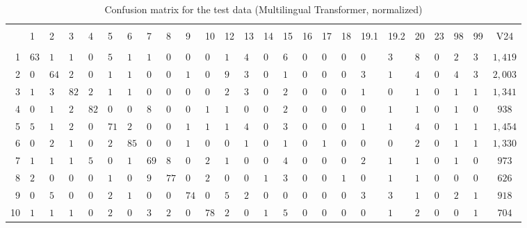 
\begin{table}[!htbp] \centering 
  \caption{Confusion matrix for the test data (Multilingual Transformer, normalized)} 
  \label{tab:confusion-tf} 
\begin{tabularx}{\textwidth}{r|XXXXXXXXXXXXXXXXXXXXXXXc} 
\\[-1.8ex]\hline 
\hline \\[-1.8ex] 
 & 1 & 2 & 3 & 4 & 5 & 6 & 7 & 8 & 9 & 10 & 12 & 13 & 14 & 15 & 16 & 17 & 18 & 19.1 & 19.2 & 20 & 23 & 98 & 99 & V24 \\ 
\hline \\[-1.8ex] 
1 & $63$ & $1$ & $1$ & $0$ & $5$ & $1$ & $1$ & $0$ & $0$ & $0$ & $1$ & $4$ & $0$ & $6$ & $0$ & $0$ & $0$ & $0$ & $3$ & $8$ & $0$ & $2$ & $3$ & $1,419$ \\ 
2 & $0$ & $64$ & $2$ & $0$ & $1$ & $1$ & $0$ & $0$ & $1$ & $0$ & $9$ & $3$ & $0$ & $1$ & $0$ & $0$ & $0$ & $3$ & $1$ & $4$ & $0$ & $4$ & $3$ & $2,003$ \\ 
3 & $1$ & $3$ & $82$ & $2$ & $1$ & $1$ & $0$ & $0$ & $0$ & $0$ & $2$ & $3$ & $0$ & $2$ & $0$ & $0$ & $0$ & $1$ & $0$ & $1$ & $0$ & $1$ & $1$ & $1,341$ \\ 
4 & $0$ & $1$ & $2$ & $82$ & $0$ & $0$ & $8$ & $0$ & $0$ & $1$ & $1$ & $0$ & $0$ & $2$ & $0$ & $0$ & $0$ & $0$ & $1$ & $1$ & $0$ & $1$ & $0$ & $938$ \\ 
5 & $5$ & $1$ & $2$ & $0$ & $71$ & $2$ & $0$ & $0$ & $1$ & $1$ & $1$ & $4$ & $0$ & $3$ & $0$ & $0$ & $0$ & $1$ & $1$ & $4$ & $0$ & $1$ & $1$ & $1,454$ \\ 
6 & $0$ & $2$ & $1$ & $0$ & $2$ & $85$ & $0$ & $0$ & $1$ & $0$ & $0$ & $1$ & $0$ & $1$ & $0$ & $1$ & $0$ & $0$ & $0$ & $2$ & $0$ & $1$ & $1$ & $1,330$ \\ 
7 & $1$ & $1$ & $1$ & $5$ & $0$ & $1$ & $69$ & $8$ & $0$ & $2$ & $1$ & $0$ & $0$ & $4$ & $0$ & $0$ & $0$ & $2$ & $1$ & $1$ & $0$ & $1$ & $0$ & $973$ \\ 
8 & $2$ & $0$ & $0$ & $0$ & $1$ & $0$ & $9$ & $77$ & $0$ & $2$ & $0$ & $0$ & $1$ & $3$ & $0$ & $0$ & $1$ & $0$ & $1$ & $1$ & $0$ & $0$ & $0$ & $626$ \\ 
9 & $0$ & $5$ & $0$ & $0$ & $2$ & $1$ & $0$ & $0$ & $74$ & $0$ & $5$ & $2$ & $0$ & $0$ & $0$ & $0$ & $0$ & $3$ & $3$ & $1$ & $0$ & $2$ & $1$ & $918$ \\ 
10 & $1$ & $1$ & $1$ & $0$ & $2$ & $0$ & $3$ & $2$ & $0$ & $78$ & $2$ & $0$ & $1$ & $5$ & $0$ & $0$ & $0$ & $0$ & $1$ & $2$ & $0$ & $0$ & $1$ & $704$ \\ 

\end{tabularx}
\end{table}
